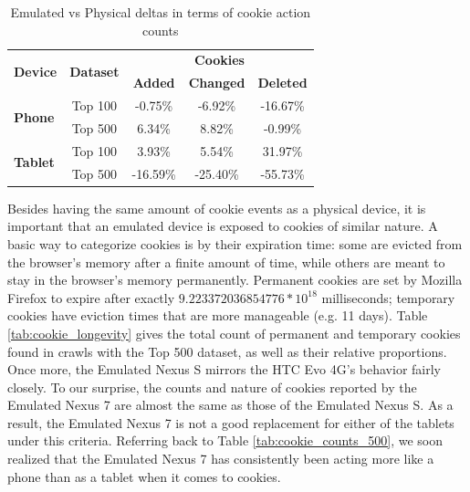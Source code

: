 \documentclass{acm_proc_article-sp}
\begin{document}
\begin{table}[htbp]
  \centering
  \caption{Emulated vs Physical deltas in terms of cookie action counts}
    \begin{tabular}{|c|c|c|c|c|}
    \hline
    \multicolumn{1}{|c|}{\multirow{2}[4]{*}{\textbf{Device}}} & \multicolumn{1}{|c|}{\multirow{2}[4]{*}{\textbf{Dataset}}} & \multicolumn{3}{|c|}{\textbf{Cookies}} \\ \cline{3-5}
    \multicolumn{1}{|c|}{} & \multicolumn{1}{|c|}{} & \multicolumn{1}{|c|}{\textbf{Added}} & \multicolumn{1}{|c|}{\textbf{Changed}} & \multicolumn{1}{|c|}{\textbf{Deleted}} \\ \hline
    \multicolumn{1}{|l|}{\multirow{2}[4]{*}{\textbf{Phone}}} & Top 100 & -0.75\% & -6.92\% & -16.67\% \\
    \multicolumn{1}{|l|}{} & Top 500 & 6.34\% & 8.82\% & -0.99\% \\
    \hline
    \multicolumn{1}{|l|}{\multirow{2}[4]{*}{\textbf{Tablet}}} & Top 100 & 3.93\% & 5.54\% & 31.97\% \\
    \multicolumn{1}{|l|}{} & Top 500 & -16.59\% & -25.40\% & -55.73\% \\ \hline
    \end{tabular}%
  \label{tab:cookie_deltas}%
\end{table}%


Besides having the same amount of cookie events as a physical device, it is important that an emulated device is exposed to cookies of similar nature. A basic way to categorize cookies is by their expiration time: some are evicted from the browser's memory after a finite amount of time, while others are meant to stay in the browser's memory permanently. Permanent cookies are set by Mozilla Firefox to expire after exactly $9.223372036854776*10^{18}$ milliseconds; temporary cookies have eviction times that are more manageable (e.g. 11 days). Table \ref{tab:cookie_longevity} gives the total count of permanent and temporary cookies found in crawls with the Top 500 dataset, as well as their relative proportions. Once more, the Emulated Nexus S mirrors the HTC Evo 4G's behavior fairly closely. To our surprise, the counts and nature of cookies reported by the Emulated Nexus 7 are almost the same as those of the Emulated Nexus S. As a result, the Emulated Nexus 7 is not a good replacement for either of the tablets under this criteria. Referring back to Table \ref{tab:cookie_counts_500}, we soon realized that the Emulated Nexus 7 has consistently been acting more like a phone than as a tablet when it comes to cookies.
\end{document}
